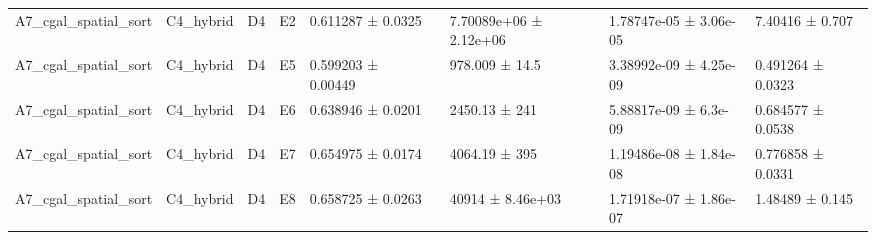 \begin{table}
\begin{tabular}{lllllllll}
A7\_cgal\_spatial\_sort & C4\_hybrid & D4 & E2 & 0.611287 ± 0.0325 &  & 7.70089e+06 ± 2.12e+06 & 1.78747e-05 ± 3.06e-05 & 7.40416 ± 0.707 \\
A7\_cgal\_spatial\_sort & C4\_hybrid & D4 & E5 & 0.599203 ± 0.00449 &  & 978.009 ± 14.5 & 3.38992e-09 ± 4.25e-09 & 0.491264 ± 0.0323 \\
A7\_cgal\_spatial\_sort & C4\_hybrid & D4 & E6 & 0.638946 ± 0.0201 &  & 2450.13 ± 241 & 5.88817e-09 ± 6.3e-09 & 0.684577 ± 0.0538 \\
A7\_cgal\_spatial\_sort & C4\_hybrid & D4 & E7 & 0.654975 ± 0.0174 &  & 4064.19 ± 395 & 1.19486e-08 ± 1.84e-08 & 0.776858 ± 0.0331 \\
A7\_cgal\_spatial\_sort & C4\_hybrid & D4 & E8 & 0.658725 ± 0.0263 &  & 40914 ± 8.46e+03 & 1.71918e-07 ± 1.86e-07 & 1.48489 ± 0.145 \\
\bottomrule
\end{tabular}
\end{table}
